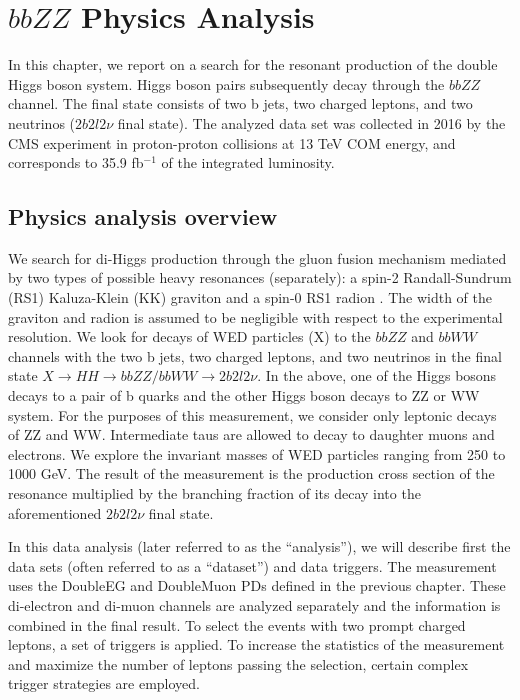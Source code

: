 \chapter{$bbZZ$ Physics Analysis}

In this chapter, we report on a search for the resonant production of the double Higgs boson system. Higgs boson pairs subsequently decay through the $bbZZ$ channel. The final state consists of two b jets, two charged leptons, and two neutrinos ($2 b 2 l 2 \nu$ final state). The analyzed data set was collected in 2016 by the CMS experiment in proton-proton collisions at 13 TeV COM energy, and corresponds to 35.9 fb$^{-1}$ of the integrated luminosity. 

\section{Physics analysis overview}
\label{sec:an_overview}

We search for di-Higgs production through the gluon fusion mechanism mediated by two types of possible heavy resonances (separately): a spin-2 Randall-Sundrum (RS1) Kaluza-Klein (KK) graviton and a spin-0 RS1 radion \cite{WED, Xanda}. The width of the graviton and radion is assumed to be negligible with respect to the experimental resolution. We look for decays of WED particles (X) to the $bbZZ$ and $bbWW$ channels with the two b jets, two charged leptons, and two neutrinos in the final state $X \rightarrow HH \rightarrow bbZZ/bbWW \rightarrow 2 b 2l 2 \nu$. In the above, one of the Higgs bosons decays to a pair of b quarks and the other Higgs boson decays to ZZ or WW system. For the purposes of this measurement, we consider only leptonic decays of ZZ and WW. Intermediate taus are allowed to decay to daughter muons and electrons. We explore the invariant masses of WED particles ranging from 250 to 1000 GeV. The result of the measurement is the production cross section of the resonance multiplied by the branching fraction of its decay into the aforementioned $2 b 2 l 2 \nu$ final state. 

In this data analysis (later referred to as the ``analysis''), we will describe first the data sets (often referred to as a ``dataset'') and data triggers. The measurement uses the DoubleEG and DoubleMuon PDs defined in the previous chapter. These di-electron and di-muon channels are analyzed separately and the information is combined in the final result. To select the events with two prompt charged leptons, a set of triggers is applied. To increase the statistics of the measurement and maximize the number of leptons passing the selection, certain complex trigger strategies are employed. 

